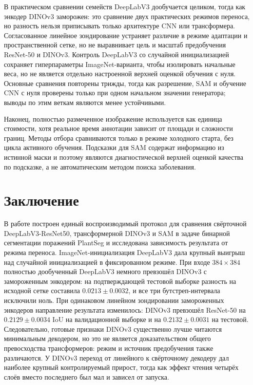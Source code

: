 \documentclass[a4paper,12pt]{extarticle}
\begin{document}
В практическом сравнении семейств DeepLabV3
дообучается целиком, тогда как энкодер DINOv3 заморожен: это сравнение двух
практических режимов переноса, но разность нельзя приписывать только архитектуре
CNN или трансформера. Согласованное линейное зондирование устраняет различие в
режиме адаптации и пространственной сетке, но не выравнивает цель и масштаб
предобучения ResNet-50 и DINOv3. Контроль DeepLabV3 со случайной инициализацией
сохраняет гиперпараметры ImageNet-варианта, чтобы изолировать начальные веса,
но не является отдельно настроенной верхней оценкой обучения с нуля. Основные
сравнения повторены трижды, тогда как разрешение, SAM и обучение CNN с нуля
проверены только при одном начальном значении генератора; выводы по этим веткам
являются менее устойчивыми.

Наконец, полностью размеченное изображение используется как единица стоимости,
хотя реальное время аннотации зависит от площади и сложности границ. Методы
отбора сравниваются только в режиме холодного старта, без цикла активного
обучения. Подсказки для SAM содержат информацию из истинной маски и поэтому
являются диагностической верхней оценкой качества по подсказке, а не
автоматическим методом поиска заболевания.

\section{Заключение}

В работе построен единый воспроизводимый протокол для сравнения свёрточной
DeepLabV3-ResNet50, трансформерной DINOv3 и SAM в задаче бинарной сегментации
поражений PlantSeg и исследована зависимость результата от режима переноса.
ImageNet-инициализация DeepLabV3 дала крупный выигрыш над случайной
инициализацией в фиксированном режиме. При входе $384\times384$ полностью
дообученный DeepLabV3 немного превзошёл DINOv3 с замороженным энкодером: на
подтверждающей тестовой выборке разность на исходной сетке составила
$0.0213\pm0.0032$, и все три бутстреп-интервала исключили ноль. При одинаковом
линейном зондировании замороженных энкодеров направление результата изменилось:
DINOv3 превзошёл ResNet-50 на $0.2129\pm0.0034$ IoU на валидационной выборке
и на $0.2132\pm0.0031$ на тестовой. Следовательно, готовые признаки DINOv3 существенно лучше
читаются минимальным декодером, но это не является доказательством общего
превосходства трансформеров: режим и источник предобучения также различаются.
У DINOv3 переход от линейного к свёрточному декодеру дал наиболее крупный
контролируемый прирост, тогда как эффект чтения четырёх слоёв вместо последнего
был мал и зависел от запуска.
\end{document}
